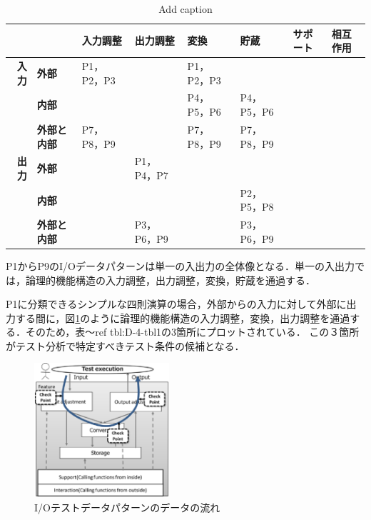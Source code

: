 \begin{table}[htbp]
  \centering
  \caption{Add caption}
    \begin{tabular}{|r|p{4em}|l|l|l|p{4em}|l|l|}
    \hline
          & \multicolumn{1}{l|}{} & \multicolumn{1}{p{4em}|}{\textbf{入力調整}} & \multicolumn{1}{p{4em}|}{\textbf{出力調整}} & \multicolumn{1}{p{4em}|}{\textbf{変換}} & \textbf{貯蔵} & \multicolumn{1}{p{2em}|}{\textbf{サポート}} & \multicolumn{1}{p{1.915em}|}{\textbf{相互作用}} \bigstrut\\
    \hline
    \multicolumn{1}{|p{1.5em}|}{\textbf{入力}} & \textbf{外部} & \multicolumn{1}{p{4em}|}{P1，P2，P3} &       & \multicolumn{1}{p{4em}|}{P1，P2，P3} & \multicolumn{1}{l|}{} &       &  \bigstrut\\
\cline{2-8}          & \textbf{内部} &       &       & \multicolumn{1}{p{4em}|}{P4，P5，P6} & P4，P5，P6 &       &  \bigstrut\\
\cline{2-8}          & \textbf{外部と内部} & \multicolumn{1}{p{4em}|}{P7，P8，P9} &       & \multicolumn{1}{p{4em}|}{P7，P8，P9} & P7，P8，P9 &       &  \bigstrut\\
    \hline
    \multicolumn{1}{|p{1.5em}|}{\textbf{出力}} & \textbf{外部} &       & \multicolumn{1}{p{4em}|}{P1，P4，P7} &       & \multicolumn{1}{l|}{} &       &  \bigstrut\\
\cline{2-8}          & \textbf{内部} &       &       &       & P2，P5，P8 &       &  \bigstrut\\
\cline{2-8}          & \textbf{外部と内部} &       & P3，P6，P9 &       & P3，P6，P9 &       &  \bigstrut\\
    \hline
    \end{tabular}%
  \label{tbl:D-4-tbl1}%
\end{table}%


P1からP9のI/Oデータパターンは単一の入出力の全体像となる．単一の入出力では，論理的機能構造の入力調整，出力調整，変換，貯蔵を通過する．

P1に分類できるシンプルな四則演算の場合，外部からの入力に対して外部に出力する間に，図\ref{fig:D-4-Fig7}のように論理的機能構造の入力調整，変換，出力調整を通過する．そのため，表〜ref {tbl:D-4-tbl1}の3箇所にプロットされている．
この３箇所がテスト分析で特定すべきテスト条件の候補となる．
 \begin{figure}[htbp]
 \begin{center}
 \includegraphics[width=5cm]{./image/D-4-Fig7.png}
 \caption{I/Oテストデータパターンのデータの流れ}
 \label{fig:D-4-Fig7}
 \end{center}
 \end{figure}

